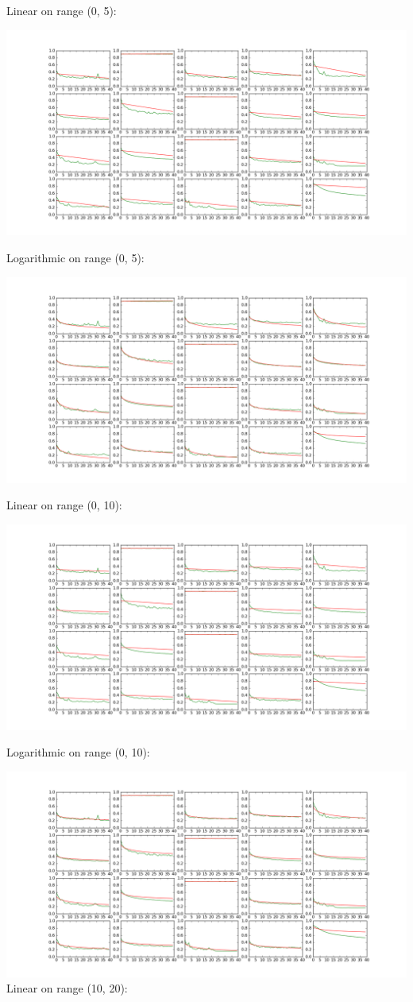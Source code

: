 \documentclass[a4paper,10pt]{article}
\begin{document}
Linear on range (0, 5):

\includegraphics[width=\textwidth]{../../figures/regression_5_lin}

Logarithmic on range (0, 5):

\includegraphics[width=\textwidth]{../../figures/regression_5_log}

Linear on range (0, 10):

\includegraphics[width=\textwidth]{../../figures/regression_10_lin}

Logarithmic on range (0, 10):

\includegraphics[width=\textwidth]{../../figures/regression_10_log}
Linear on range (10, 20):
\end{document}
